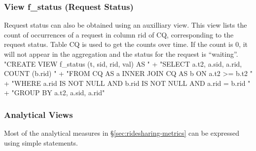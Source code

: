 \documentclass{article}
\def\nwendcode{\endtrivlist \endgroup}
\let\nwdocspar=\par
\theoremstyle{definition}
\begin{document}
\subsubsection{View f\_status (Request Status)}
Request status can also be obtained using an auxilliary view.  This view lists
the count of occurrences of a request in column \textsf{rid} of CQ,
corresponding to the request status.  Table CQ is used to get the counts over
time.  If the count is 0, it will not appear in the aggregation and the status
for the request is ``waiting''.
\nwenddocs{}\endmoddef{}
"CREATE VIEW f_status (t, sid, rid, val) AS "
  + "SELECT a.t2, a.sid, a.rid, COUNT (b.rid) "
  + "FROM CQ AS a INNER JOIN CQ AS b ON a.t2 >= b.t2 "
  + "WHERE a.rid IS NOT NULL AND b.rid IS NOT NULL AND a.rid = b.rid "
  + "GROUP BY a.t2, a.sid, a.rid"
\nwendcode{}\nwdocspar

\subsubsection{Analytical Views}
Most of the analytical measures in \S\ref{sec:ridesharing-metrics} can
be expressed using simple statements.
\end{document}
